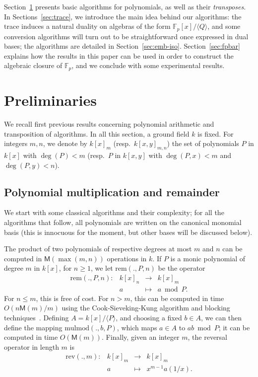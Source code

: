 \documentclass{sig-alternate}
\def\M {\ensuremath{\mathsf{M}}}
\def\F {\ensuremath{\mathbb{F}}}
\def\rem {\ensuremath{\mathrm{rem}}}
\def\mulmod {\ensuremath{\mathrm{mulmod}}}
\def\rev {\ensuremath{\mathrm{rev}}}
\newcounter{algo}
\newcommand{\ang}[1]{\langle#1\rangle}
\begin{document}
  Section~\ref{sec:prelim} presents basic
algorithms for polynomials, as well as their {\em transposes}.  In
Sections~\ref{sec:trace}, we introduce the main idea behind our
algorithms: the trace induces a natural duality on algebras of the
form $\F_p[x]/\ang{Q}$, and some conversion algorithms will turn out
to be straightforward once expressed in dual bases; the algorithms are
detailed in Section~\ref{sec:emb-iso}. Section~\ref{sec:fpbar}
explains how the results in this paper can be used in order to
construct the algebraic closure of $\F_p$, and we conclude with some
experimental results.


\section{Preliminaries}\label{sec:prelim}

We recall first previous results concerning polynomial arithmetic and
transposition of algorithms. In all this section, a ground field $k$ is
fixed. For integers $m,n$, we denote by $k[x]_m$
(resp.\ $k[x,y]_{m,n}$) the set of polynomials $P$ in $k[x]$ with
$\deg(P) <m$ (resp.\ $P$ in $k[x,y]$ with $\deg(P,x) <m$ and
$\deg(P,y)<n$).


\subsection{Polynomial multiplication and remainder}

We start with some classical algorithms and their complexity; for all
the algorithms that follow, all polynomials are written on the
canonical monomial basis (this is innocuous for the moment, but other
bases will be discussed below).

The product of two polynomials of respective degrees at most $m$ and
$n$ can be computed in $\M(\max(m,n))$ operations in $k$.  If $P$ is a
monic polynomial of degree $m$ in $k[x]$, for $n \ge 1$, we let
$\rem(.,P,n)$ be the operator
$$
\begin{array}{cccc}
\rem(.,P,n): &k[x]_n& \to &k[x]_{m}\\
& a & \mapsto & a \bmod P.
\end{array}$$ 
For $n \le m$, this is free of cost. For $n > m$, this can be computed
in time $O(n\M(m)/m)$ using the Cook-Sieveking-Kung algorithm and
blocking techniques~\cite[Ch.~5.1.3]{Bostan10}. Defining
$A=k[x]/\ang{P}$, and choosing a fixed $b \in A$, we can then define
the mapping $\mulmod(.,b,P)$, which maps $a \in A$ to $ab \bmod P$; it
can be computed in time $O(\M(m))$. Finally, given an integer $m$, the
reversal operator in length $m$ is 
$$
\begin{array}{cccc}
\rev(.,m): &k[x]_m &\to& k[x]_m  \\
& a & \mapsto & x^{m-1} a(1/x).
\end{array}$$ 
\end{document}
